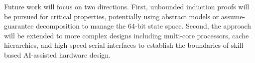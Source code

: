 \documentclass[conference]{IEEEtran}
\newcommand{\blind}[1]{[Anonymous]}
\begin{document}
Future work will focus on two directions. First, unbounded induction proofs will be pursued for critical properties, potentially using abstract models or assume-guarantee decomposition to manage the 64-bit state space. Second, the approach will be extended to more complex designs including multi-core processors, cache hierarchies, and high-speed serial interfaces to establish the boundaries of skill-based AI-assisted hardware design.


\clearpage


\end{document}
